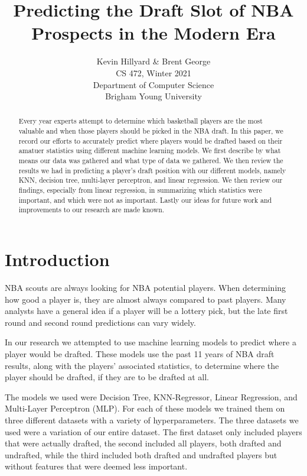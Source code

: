 \documentclass{article}
\title{Predicting the Draft Slot of NBA Prospects in the Modern Era}
\author{Kevin Hillyard \& Brent George \\
CS 472, Winter 2021 \\
Department of Computer Science\\
Brigham Young University}
\begin{document}
\maketitle

\begin{abstract}
  Every year experts attempt to determine which basketball players are the most
  valuable and when those players should be picked in the NBA draft. In this
  paper, we record our efforts to accurately predict where players would be
  drafted based on their amatuer statistics using different machine learning
  models. We first describe by what means our data was gathered and what type of
  data we gathered. We then review the results we had in predicting a player’s
  draft position with our different models, namely KNN, decision tree,
  multi-layer perceptron, and linear regression. We then review our findings,
  especially from linear regression, in summarizing which statistics were
  important, and which were not as important. Lastly our ideas for future work
  and improvements to our research are made known.
\end{abstract}

\section{Introduction}

NBA scouts are always looking for NBA potential players. When determining how
good a player is, they are almost always compared to past players. Many analysts
have a general idea if a player will be a lottery pick, but the late first round
and second round predictions can vary widely.

In our research we attempted to use machine learning models to predict where a
player would be drafted. These models use the past 11 years of NBA draft
results, along with the players’ associated statistics, to determine where the
player should be drafted, if they are to be drafted at all.

The models we used were Decision Tree, KNN-Regressor, Linear Regression, and
Multi-Layer Perceptron (MLP). For each of these models we trained them on three
different datasets with a variety of hyperparameters. The three datasets we used
were a variation of our entire dataset. The first dataset only included players
that were actually drafted, the second included all players, both drafted
and undrafted, while the third included both drafted and undrafted players but
without features that were deemed less important.
\end{document}
